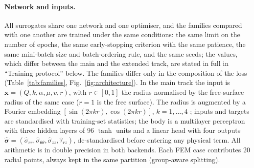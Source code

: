 \paragraph{Network and inputs.}
All surrogates share one network and one optimiser, and the families compared
with one another are trained under the same conditions: the same limit on the
number of epochs, the same early-stopping criterion with the same patience, the
same mini-batch size and batch-ordering rule, and the same seeds; the values,
which differ between the main and the extended track, are stated in full in
``Training protocol'' below. The
families differ only in the composition of the loss (Table~\ref{tab:families},
Fig.~\ref{fig:architecture}). In the main track the input is
$\mathbf{x}=(Q,k,\alpha,\mu,v,r)$, with $r\in[0,1]$ the radius normalised by the
free-surface radius of the same case ($r=1$ is the free surface).
The radius is augmented by a Fourier embedding $[\sin(2\pi k r),\cos(2\pi k r)]$,
$k=1,\dots,4$ \cite{TODO-fourier-features};
inputs and targets are standardised with training-set statistics; the body is a
multilayer perceptron with three hidden layers of 96 $\tanh$ units and a linear
head with four outputs
$\hat{\boldsymbol\sigma}=(\hat\sigma_{rr},\hat\sigma_{\theta\theta},\hat\sigma_{zz},\hat\tau_{rz})$,
de-standardised before entering any physical term.
All arithmetic is in double precision in both backends.
Each FEM case contributes 20 radial points, always kept in the same partition
(group-aware splitting).

